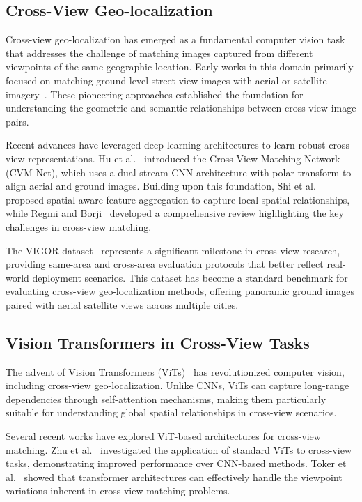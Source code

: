 
\subsection{Cross-View Geo-localization}

Cross-view geo-localization has emerged as a fundamental computer vision task that addresses the challenge of matching images captured from different viewpoints of the same geographic location. Early works in this domain primarily focused on matching ground-level street-view images with aerial or satellite imagery~\cite{workman2015predicting,lin2013cross}. These pioneering approaches established the foundation for understanding the geometric and semantic relationships between cross-view image pairs.

Recent advances have leveraged deep learning architectures to learn robust cross-view representations. Hu et al.~\cite{hu2018cvm} introduced the Cross-View Matching Network (CVM-Net), which uses a dual-stream CNN architecture with polar transform to align aerial and ground images. Building upon this foundation, Shi et al.~\cite{shi2019spatial} proposed spatial-aware feature aggregation to capture local spatial relationships, while Regmi and Borji~\cite{regmi2018cross} developed a comprehensive review highlighting the key challenges in cross-view matching.

The VIGOR dataset~\cite{zhu2021vigor} represents a significant milestone in cross-view research, providing same-area and cross-area evaluation protocols that better reflect real-world deployment scenarios. This dataset has become a standard benchmark for evaluating cross-view geo-localization methods, offering panoramic ground images paired with aerial satellite views across multiple cities.

\subsection{Vision Transformers in Cross-View Tasks}

The advent of Vision Transformers (ViTs)~\cite{dosovitskiy2020image} has revolutionized computer vision, including cross-view geo-localization. Unlike CNNs, ViTs can capture long-range dependencies through self-attention mechanisms, making them particularly suitable for understanding global spatial relationships in cross-view scenarios.

Several recent works have explored ViT-based architectures for cross-view matching. Zhu et al.~\cite{zhu2023vigor} investigated the application of standard ViTs to cross-view tasks, demonstrating improved performance over CNN-based methods. Toker et al.~\cite{toker2021coming} showed that transformer architectures can effectively handle the viewpoint variations inherent in cross-view matching problems.

